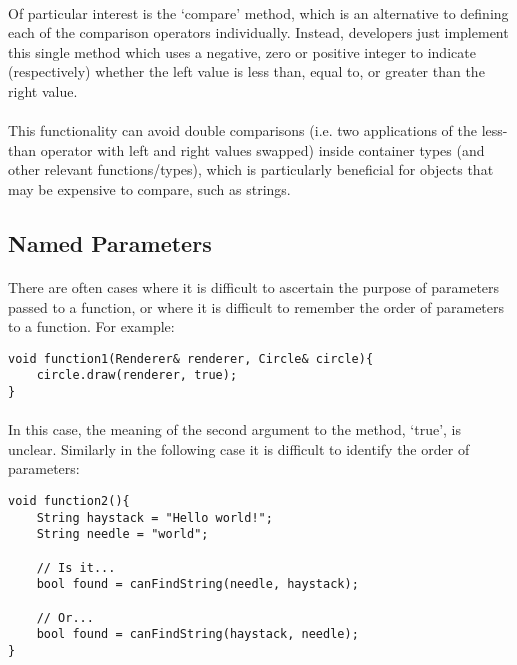 \documentclass[12pt,twoside,notitlepage]{report}
\begin{document}
\paragraph{}
Of particular interest is the `compare' method, which is an alternative to defining each of the comparison operators individually. Instead, developers just implement this single method which uses a negative, zero or positive integer to indicate (respectively) whether the left value is less than, equal to, or greater than the right value.

\paragraph{}
This functionality can avoid double comparisons (i.e. two applications of the less-than operator with left and right values swapped) inside container types (and other relevant functions/types), which is particularly beneficial for objects that may be expensive to compare, such as strings.

\clearpage

\subsection{Named Parameters}

\paragraph{}
There are often cases where it is difficult to ascertain the purpose of parameters passed to a function, or where it is difficult to remember the order of parameters to a function. For example:


\begin{lstlisting}
void function1(Renderer& renderer, Circle& circle){
	circle.draw(renderer, true);
}
\end{lstlisting}


\paragraph{}
In this case, the meaning of the second argument to the method, `true', is unclear. Similarly in the following case it is difficult to identify the order of parameters:


\begin{lstlisting}
void function2(){
	String haystack = "Hello world!";
	String needle = "world";
	
	// Is it...
	bool found = canFindString(needle, haystack);
	
	// Or...
	bool found = canFindString(haystack, needle);
}
\end{lstlisting}
\end{document}

